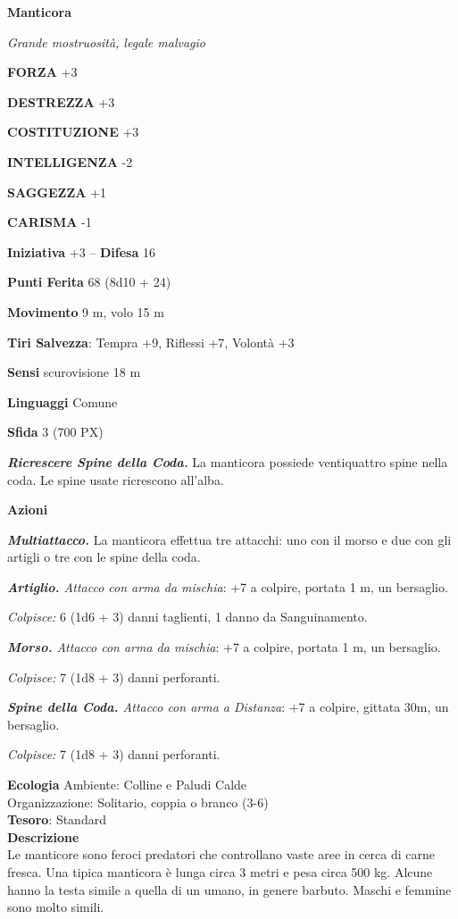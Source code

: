 \begin{multicols}{2}
	\medskip{}\textbf{Manticora}

	\textit{Grande mostruosità, legale malvagio}

	\textbf{FORZA} +3

	\textbf{DESTREZZA} +3

	\textbf{COSTITUZIONE} +3

	\textbf{INTELLIGENZA} -2

	\textbf{SAGGEZZA} +1

	\textbf{CARISMA} -1

	\textbf{Iniziativa} +3 -- \textbf{Difesa} 16

	\textbf{Punti Ferita} 68 (8d10 + 24)

	\textbf{Movimento} 9 m, volo 15 m

	\textbf{Tiri Salvezza}: Tempra +9, Riflessi +7, Volontà +3

	\textbf{Sensi} scurovisione 18 m

	\textbf{Linguaggi} Comune

	\textbf{Sfida} 3 (700 PX)

	\textit{\textbf{Ricrescere Spine della Coda.}} La manticora possiede ventiquattro spine nella coda. Le spine usate ricrescono all'alba.

	\textbf{Azioni}

	\textit{\textbf{Multiattacco.}} La manticora effettua tre attacchi: uno con il morso e due con gli artigli o tre con le spine della coda.

	\textit{\textbf{Artiglio.} Attacco con arma da mischia}: +7 a colpire, portata 1 m, un bersaglio.

	\textit{Colpisce:} 6 (1d6 + 3) danni taglienti, 1 danno da Sanguinamento.

	\textit{\textbf{Morso.} Attacco con arma da mischia}: +7 a colpire, portata 1 m, un bersaglio.

	\textit{Colpisce:} 7 (1d8 + 3) danni perforanti.

	\textit{\textbf{Spine della Coda.} Attacco con arma a Distanza}: +7 a colpire, gittata 30m, un bersaglio.

	\textit{Colpisce:} 7 (1d8 + 3) danni perforanti.

	\textbf{Ecologia}
	Ambiente: Colline e Paludi Calde\\
	Organizzazione: Solitario, coppia o branco (3-6)\\
	\textbf{Tesoro}: Standard\\

	\textbf{Descrizione}\\
	Le manticore sono feroci predatori che controllano vaste aree in cerca di carne fresca. Una tipica manticora è lunga circa 3 metri e pesa circa 500 kg. Alcune hanno la testa simile a quella di un umano, in genere barbuto. Maschi e femmine sono molto simili.


\end{multicols}
